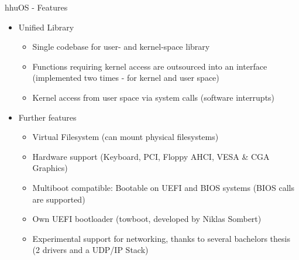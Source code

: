 	\begin{frame}{hhuOS - Features}
		\begin{itemize}
			\item Unified Library
			\begin{itemize}
				\item Single codebase for user- and kernel-space library
				\item Functions requiring kernel access are outsourced into an interface (implemented two times - for kernel and user space)
				\item Kernel access from user space via system calls (software interrupts)
			\end{itemize}
			\pause
			\item Further features
			\begin{itemize}
				\item Virtual Filesystem (can mount physical filesystems)
				\item Hardware support (Keyboard, PCI, Floppy AHCI, VESA \& CGA Graphics)
				\item Multiboot compatible: Bootable on UEFI and BIOS systems (BIOS calls are supported)
				\item Own UEFI bootloader (towboot, developed by Niklas Sombert)
				\item Experimental support for networking, thanks to several bachelors thesis (2 drivers and a UDP/IP Stack)
			\end{itemize}	
		\end{itemize}
	\end{frame}